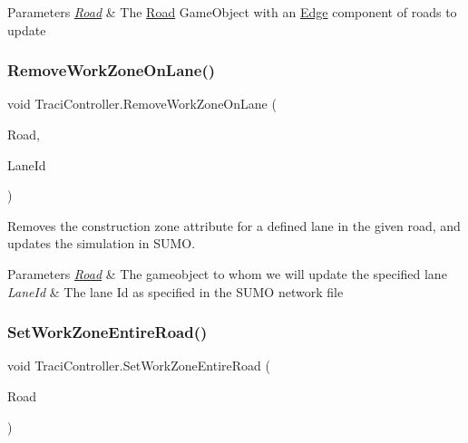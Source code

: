 \begin{DoxyParams}{Parameters}
{\em \mbox{\hyperlink{struct_road}{Road}}} & The \mbox{\hyperlink{struct_road}{Road}} Game\+Object with an \mbox{\hyperlink{class_edge}{Edge}} component of roads to update \\
\hline
\end{DoxyParams}
\mbox{\label{class_traci_controller_adc26e9e3e188ed89f864b2e4ab8a3393}} 
\subsubsection{\texorpdfstring{RemoveWorkZoneOnLane()}{RemoveWorkZoneOnLane()}}
{\footnotesize\ttfamily void Traci\+Controller.\+Remove\+Work\+Zone\+On\+Lane (\begin{DoxyParamCaption}\item[{Game\+Object}]{Road,  }\item[{String}]{Lane\+Id }\end{DoxyParamCaption})}



Removes the construction zone attribute for a defined lane in the given road, and updates the simulation in S\+U\+MO. 


\begin{DoxyParams}{Parameters}
{\em \mbox{\hyperlink{struct_road}{Road}}} & The gameobject to whom we will update the specified lane\\
\hline
{\em Lane\+Id} & The lane Id as specified in the S\+U\+MO network file\\
\hline
\end{DoxyParams}
\mbox{\label{class_traci_controller_af0beb4c7ca635ebdd090f05e42770deb}} 
\subsubsection{\texorpdfstring{SetWorkZoneEntireRoad()}{SetWorkZoneEntireRoad()}}
{\footnotesize\ttfamily void Traci\+Controller.\+Set\+Work\+Zone\+Entire\+Road (\begin{DoxyParamCaption}\item[{Game\+Object}]{Road }\end{DoxyParamCaption})}



